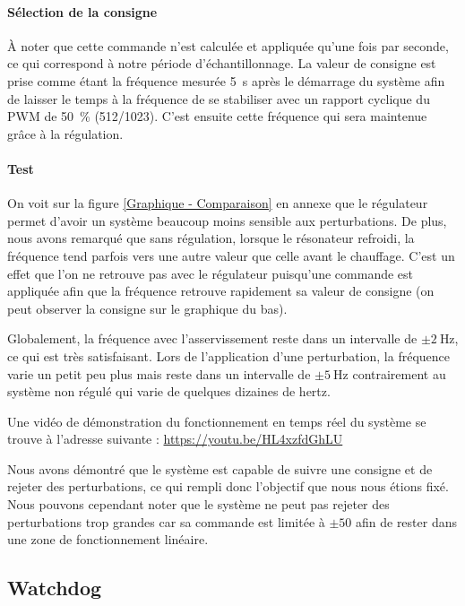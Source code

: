 \documentclass[12pt, a4paper, titlepage]{article}
\begin{document}
\paragraph{Sélection de la consigne}

À noter que cette commande n'est calculée et appliquée qu'une fois par seconde, ce qui correspond à notre période d'échantillonnage. La valeur de consigne est prise comme étant la fréquence mesurée \SI{5}{\second} après le démarrage du système afin de laisser le temps à la fréquence de se stabiliser avec un rapport cyclique du PWM de \SI{50}{\percent} (512/1023). C'est ensuite cette fréquence qui sera maintenue grâce à la régulation.

\paragraph{Test}

On voit sur la figure \ref{Graphique - Comparaison} en annexe que le régulateur permet d'avoir un système beaucoup moins sensible aux perturbations. De plus, nous avons remarqué que sans régulation, lorsque le résonateur refroidi, la fréquence tend parfois vers une autre valeur que celle avant le chauffage. C'est un effet que l'on ne retrouve pas avec le régulateur puisqu'une commande est appliquée afin que la fréquence retrouve rapidement sa valeur de consigne (on peut observer la consigne sur le graphique du bas).

Globalement, la fréquence avec l'asservissement reste dans un intervalle de $\pm \SI{2}{\hertz}$, ce qui est très satisfaisant. Lors de l'application d'une perturbation, la fréquence varie un petit peu plus mais reste dans un intervalle de $\pm \SI{5}{\hertz}$ contrairement au système non régulé qui varie de quelques dizaines de hertz.

Une vidéo de démonstration du fonctionnement en temps réel du système se trouve à l'adresse suivante : \url{https://youtu.be/HL4xzfdGhLU}

Nous avons démontré que le système est capable de suivre une consigne et de rejeter des perturbations, ce qui rempli donc l'objectif que nous nous étions fixé. Nous pouvons cependant noter que le système ne peut pas rejeter des perturbations trop grandes car sa commande est limitée à $\pm 50$ afin de rester dans une zone de fonctionnement linéaire.

\subsection{Watchdog}
\end{document}
